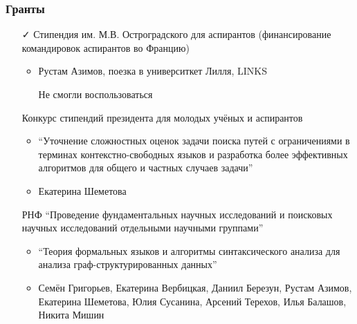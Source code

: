 \documentclass[xcolor=table]{beamer}
\begin{document}
\begin{frame}[fragile]

  \frametitle{Гранты}
\begin{itemize}
      \item[\faCheck] Стипендия им. М.В. Остроградского для аспирантов (финансирование командировок аспирантов во Францию)
      \begin{itemize}
        \item Рустам Азимов, поезка в университкет Лилля, LINKS
        \item[\faFrownO] Не смогли воспользоваться
      \end{itemize}

      \item[\faHourglassHalf] Конкурс стипендий президента для молодых учёных и аспирантов
      \begin{itemize}
        \item ``Уточнение сложностных оценок задачи поиска путей с ограничениями в терминах контекстно-свободных языков и разработка более эффективных алгоритмов для общего и частных случаев задачи''
        \item Екатерина Шеметова
      \end{itemize}

      \item[\faTimes] РНФ ``Проведение фундаментальных научных исследований и поисковых научных исследований отдельными научными группами''
      \begin{itemize}
        \item ``Теория формальных языков и алгоритмы синтаксического анализа для анализа граф-структурированных данных''
        \item Семён Григорьев, Екатерина Вербицкая, Даниил Березун, Рустам Азимов, Екатерина Шеметова, Юлия Сусанина, Арсений Терехов, Илья Балашов, Никита Мишин
      \end{itemize}

      
\end{itemize}
\end{frame}
\end{document}
